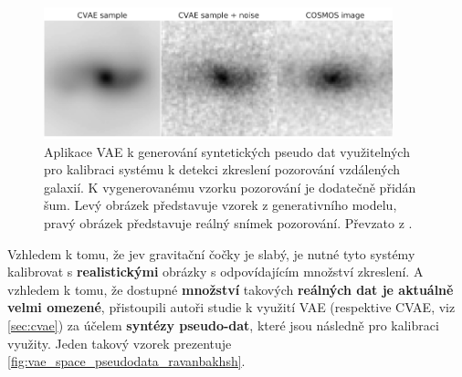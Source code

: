 \begin{figure}[H]
    \centering
    \includegraphics[width=0.9\textwidth]{figures/applications/vae_space_pseudodata_ravanbakhsh.png}
    \caption{Aplikace VAE k generování syntetických pseudo dat využitelných pro kalibraci systému k detekci zkreslení pozorování vzdálených galaxií. K vygenerovanému vzorku pozorování je dodatečně přidán šum. Levý obrázek představuje vzorek z generativního modelu, pravý obrázek představuje reálný snímek pozorování. Převzato z \cite{Ravanbakhsh2016}.}
    \label{fig:vae_space_pseudodata_ravanbakhsh}
\end{figure}


Vzhledem k tomu, že jev gravitační čočky je slabý, je nutné tyto systémy kalibrovat s \textbf{realistickými} obrázky s odpovídajícím množství zkreslení.
A vzhledem k tomu, že dostupné \textbf{množství} takových \textbf{reálných dat je aktuálně velmi omezené}, přistoupili autoři studie k využití VAE (respektive CVAE, viz \autoref{sec:cvae}) za účelem \textbf{syntézy pseudo-dat}, které jsou následně pro kalibraci využity. Jeden takový vzorek prezentuje \autoref{fig:vae_space_pseudodata_ravanbakhsh}.